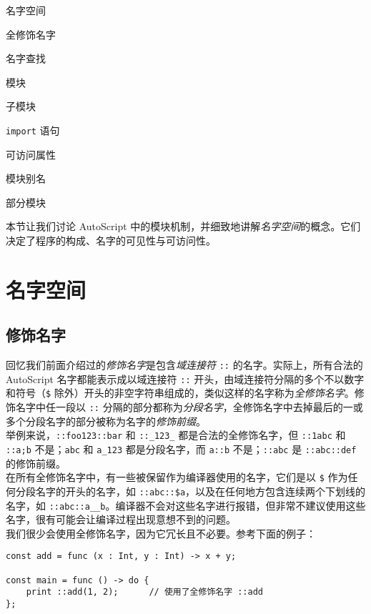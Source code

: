 \begin{introduction}
	\item 名字空间
	\item 全修饰名字
	\item 名字查找
	\item 模块
	\item 子模块
	\item \lstinline!import! 语句
	\item 可访问属性
	\item 模块别名
	\item 部分模块
\end{introduction}

本节让我们讨论 AutoScript 中的模块机制，并细致地讲解\emph{名字空间}的概念。它们决定了程序的构成、名字的可见性与可访问性。

\section{名字空间}

\subsection{修饰名字}

回忆我们前面介绍过的\emph{修饰名字}是包含\emph{域连接符} \lstinline!::! 的名字。实际上，所有合法的 AutoScript 名字都能表示成以域连接符 \lstinline!::! 开头，由域连接符分隔的多个不以数字和符号（\texttt{\$} 除外）开头的非空字符串组成的，类似这样的名字称为\emph{全修饰名字}。修饰名字中任一段以 \lstinline!::! 分隔的部分都称为\emph{分段名字}，全修饰名字中去掉最后的一或多个分段名字的部分被称为名字的\emph{修饰前缀}。 \\

举例来说，\texttt{::foo123::bar} 和 \texttt{::\_123\_} 都是合法的全修饰名字，但 \texttt{::1abc} 和 \texttt{::a;b} 不是；\texttt{abc} 和 \texttt{a\_123} 都是分段名字，而 \texttt{a::b} 不是；\texttt{::abc} 是 \texttt{::abc::def} 的修饰前缀。 \\

在所有全修饰名字中，有一些被保留作为编译器使用的名字，它们是以 \texttt{\$} 作为任何分段名字的开头的名字，如 \texttt{::abc::\$a}，以及在任何地方包含连续两个下划线的名字，如 \texttt{::abc::a\_\_b}。编译器不会对这些名字进行报错，但非常不建议使用这些名字，很有可能会让编译过程出现意想不到的问题。 \\

我们很少会使用全修饰名字，因为它冗长且不必要。参考下面的例子：

\begin{lstlisting}
const add = func (x : Int, y : Int) -> x + y;

const main = func () -> do {
	print ::add(1, 2);		// 使用了全修饰名字 ::add
};
\end{lstlisting}

